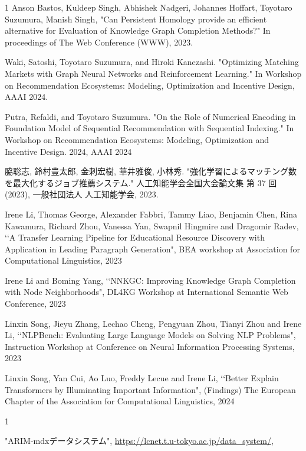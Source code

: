 \begin{査読付}{1}
Anson Bastos, Kuldeep Singh, Abhishek Nadgeri, Johannes Hoffart, Toyotaro Suzumura, Manish Singh, "Can Persistent Homology provide an efficient alternative for Evaluation of Knowledge Graph Completion Methods?" In proceedings of The Web Conference (WWW), 2023.

Waki, Satoshi, Toyotaro Suzumura, and Hiroki Kanezashi. "Optimizing Matching Markets with Graph Neural Networks and Reinforcement Learning." In Workshop on Recommendation Ecosystems: Modeling, Optimization and Incentive Design, AAAI 2024.

Putra, Refaldi, and Toyotaro Suzumura. "On the Role of Numerical Encoding in Foundation Model of Sequential Recommendation with Sequential Indexing." In Workshop on Recommendation Ecosystems: Modeling, Optimization and Incentive Design. 2024, AAAI 2024


脇聡志, 鈴村豊太郎, 金刺宏樹, 華井雅俊, 小林秀. "強化学習によるマッチング数を最大化するジョブ推薦システム." 人工知能学会全国大会論文集 第 37 回 (2023), 一般社団法人 人工知能学会, 2023.


Irene Li, Thomas George, Alexander Fabbri, Tammy Liao, Benjamin Chen, Rina Kawamura, Richard Zhou, Vanessa Yan, Swapnil Hingmire and Dragomir Radev, \lq\lq A Transfer Learning Pipeline for Educational Resource Discovery with Application in Leading Paragraph Generation", BEA workshop at Association for Computational Linguistics, 2023

Irene Li and Boming Yang, \lq\lq NNKGC: Improving Knowledge Graph Completion with Node Neighborhoods", DL4KG Workshop at International Semantic Web Conference, 2023

Linxin Song, Jieyu Zhang, Lechao Cheng, Pengyuan Zhou, Tianyi Zhou and Irene Li, \lq\lq NLPBench: Evaluating Large Language Models on Solving NLP Problems", Instruction Workshop at Conference on Neural Information Processing Systems, 2023


Linxin Song, Yan Cui, Ao Luo, Freddy Lecue and Irene Li, \lq\lq Better Explain Transformers by Illuminating Important Information", (Findings) The European Chapter of the Association for Computational Linguistics, 2024

\end{査読付}

\begin{公開}{1}


"ARIM-mdxデータシステム",
\url{https://lcnet.t.u-tokyo.ac.jp/data_system/},

\end{公開}

